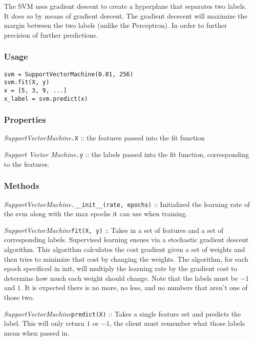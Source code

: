 \documentclass{article}
\begin{document}
The SVM uses gradient descent to create a hyperplane that separates two labels.
It does so by means of gradient descent. The gradient decscent will maximize the
margin between the two labels (unlike the Perceptron). In order to further
precision of further predictions.

\subsubsection{Usage}

\begin{verbatim}
svm = SupportVectorMachine(0.01, 256)
svm.fit(X, y)
x = [5, 3, 9, ...]
x_label = svm.predict(x)
\end{verbatim}

\subsubsection{Properties}

\textit{SupportVectorMachine}\texttt{.X} :: the features passed into the fit function

\textit{Support Vector Machine}\texttt{.y} :: the labels passed into the fit function,
corresponding to the features.

\subsubsection{Methods}

\textit{SupportVectorMachine}\texttt{.\_\_init\_\_(rate, epochs)} :: Initialized
the learning rate of the svm along with the max epochs it can use when training.

\textit{SupportVectorMachine}\texttt{fit(X, y)} :: Takes in a set of features
and a set of corresponding labels. Supervised learning ensues via a stochastic
gradient descent algorithm. This algorithm calculates the cost gradient given a
set of weights and then tries to minimize that cost by changing the weights. The
algorithm, for each epoch specificed in init, will multiply the learning rate by
the gradient cost to determine how much each weight should change. Note that the
labels must be $-1$ and $1$. It is expected there is no more, no less, and no
numbers that aren't one of those two.

\textit{SupportVectorMachine}\texttt{predict(X)} :: Takes a single feature set
and predicts the label. This will only return $1$ or $-1$, the client must
remember what those labels mean when passed in.
\end{document}
